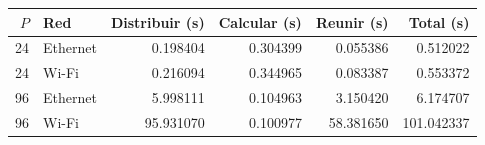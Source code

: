 \begin{center}
\small
\begin{tabular}{rlrrrr}
\toprule
$P$ & Red & Distribuir (s) & Calcular (s) & Reunir (s) & Total (s) \\
\midrule
24 & Ethernet & 0.198404 & 0.304399 & 0.055386 & 0.512022 \\
24 & Wi-Fi & 0.216094 & 0.344965 & 0.083387 & 0.553372 \\
96 & Ethernet & 5.998111 & 0.104963 & 3.150420 & 6.174707 \\
96 & Wi-Fi & 95.931070 & 0.100977 & 58.381650 & 101.042337 \\
\bottomrule
\end{tabular}
\end{center}
